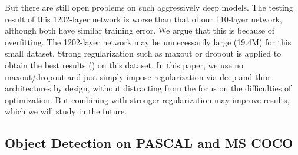 \documentclass[10pt,twocolumn,letterpaper]{article}
\begin{document}
But there are still open problems on such aggressively deep models.
The testing result of this 1202-layer network is worse than that of our 110-layer network, although both have similar training error. We argue that this is because of overfitting.
The 1202-layer network may be unnecessarily large (19.4M) for this small dataset. Strong regularization such as maxout \cite{Goodfellow2013} or dropout \cite{Hinton2012} is applied to obtain the best results (\cite{Goodfellow2013,Lin2013,Lee2014,Romero2015}) on this dataset.
In this paper, we use no maxout/dropout and just simply impose regularization via deep and thin architectures by design, without distracting from the focus on the difficulties of optimization. But combining with stronger regularization may improve results, which we will study in the future.

\subsection{Object Detection on PASCAL and MS COCO}
\end{document}
